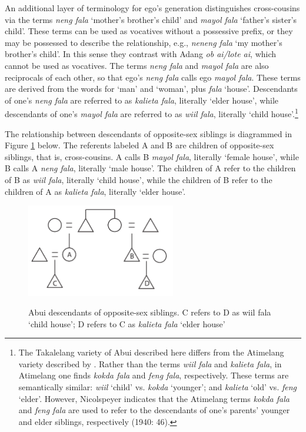 An additional layer of terminology for ego's generation distinguishes cross-cousins via the terms \textit{neng fala} `mother's brother's child' and \textit{mayol fala} `father's sister's child'. These terms can be used as vocatives without a possessive prefix, or they may be possessed to describe the relationship, e.g., \textit{neneng fala} `my mother's brother's child'. In this sense they contrast with Adang \textit{ob ai/lote ai}, which cannot be used as vocatives. The terms \textit{neng fala} and \textit{mayol fala} are also reciprocals of each other, so that ego's \textit{neng fala} calls ego \textit{mayol fala}. These terms are derived from the words for `man' and `woman', plus \textit{fala} `house'. Descendants of one's \textit{neng fala} are referred to as \textit{kalieta fala}, literally `elder house', while descendants of one's \textit{mayol fala} are referred to as \textit{wiil fala}, literally `child house'.\footnote{{ }  The Takalelang variety of Abui described here differs from the Atimelang variety described by \citet{Nicolspeyer1940}. Rather than the terms \textit{wiil fala} and \textit{kalieta fala}, in Atimelang one finds \textit{kokda fala} and \textit{feng fala}, respectively. These terms are semantically similar: \textit{wiil} `child' vs. \textit{kokda} `younger'; and \textit{kalieta} `old' vs. \textit{feng} `elder'. However, Nicolspeyer indicates that the Atimelang terms \textit{kokda fala} and \textit{feng fala} are used to refer to the descendants of one's parents' younger and elder siblings, respectively (1940: 46).}  

The relationship between descendants of opposite-sex siblings is diagrammed in Figure \ref{fig11} below. The referents labeled A and B are children of opposite-sex siblings, that is, cross-cousins. A calls B \textit{mayol fala}, literally `female house', while B calls A \textit{neng fala}, literally `male house'. The children of A refer to the children of B as \textit{wiil fala}, literally `child house', while the children of B refer to the children of A as \textit{kalieta fala}, literally `elder house'. 

\begin{figure}\centering
\includegraphics[width=6.5cm]{figures/Holton_ch5_fig11.pdf}
\label{fig11}
\caption[Abui descendants of opposite-sex siblings]{Abui descendants of opposite-sex siblings. C refers to D as wiil fala `child house'; D refers to C as \textit{kalieta fala} `elder house'}
\end{figure}  

